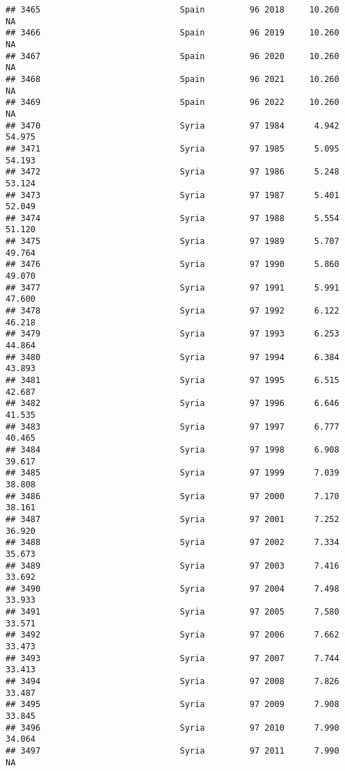 \documentclass[
]{article}
\begin{document}
\begin{verbatim}
## 3465                            Spain         96 2018     10.260         NA
## 3466                            Spain         96 2019     10.260         NA
## 3467                            Spain         96 2020     10.260         NA
## 3468                            Spain         96 2021     10.260         NA
## 3469                            Spain         96 2022     10.260         NA
## 3470                            Syria         97 1984      4.942     54.975
## 3471                            Syria         97 1985      5.095     54.193
## 3472                            Syria         97 1986      5.248     53.124
## 3473                            Syria         97 1987      5.401     52.049
## 3474                            Syria         97 1988      5.554     51.120
## 3475                            Syria         97 1989      5.707     49.764
## 3476                            Syria         97 1990      5.860     49.070
## 3477                            Syria         97 1991      5.991     47.600
## 3478                            Syria         97 1992      6.122     46.218
## 3479                            Syria         97 1993      6.253     44.864
## 3480                            Syria         97 1994      6.384     43.893
## 3481                            Syria         97 1995      6.515     42.687
## 3482                            Syria         97 1996      6.646     41.535
## 3483                            Syria         97 1997      6.777     40.465
## 3484                            Syria         97 1998      6.908     39.617
## 3485                            Syria         97 1999      7.039     38.808
## 3486                            Syria         97 2000      7.170     38.161
## 3487                            Syria         97 2001      7.252     36.920
## 3488                            Syria         97 2002      7.334     35.673
## 3489                            Syria         97 2003      7.416     33.692
## 3490                            Syria         97 2004      7.498     33.933
## 3491                            Syria         97 2005      7.580     33.571
## 3492                            Syria         97 2006      7.662     33.473
## 3493                            Syria         97 2007      7.744     33.413
## 3494                            Syria         97 2008      7.826     33.487
## 3495                            Syria         97 2009      7.908     33.845
## 3496                            Syria         97 2010      7.990     34.064
## 3497                            Syria         97 2011      7.990         NA

\end{verbatim}
\end{document}

